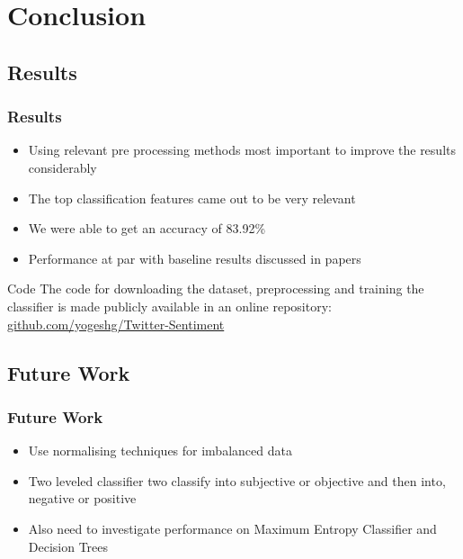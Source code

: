\documentclass{beamer}
\begin{document}
\section{Conclusion}
\subsection{Results}

\begin{frame}
\frametitle{Results}
\begin{itemize}
\item Using relevant pre processing methods most important to improve the results considerably
\item The top classification features came out to be very relevant
\item We were able to get an accuracy of 83.92\%
\item Performance at par with baseline results discussed in papers
\end{itemize}

\begin{block}{Code}
The code for downloading the dataset, preprocessing and training the classifier
is made publicly available in an online repository:\\
\href{https://github.com/yogeshg/Twitter-Sentiment}
{ github.com/yogeshg/Twitter-Sentiment}
\end{block}

\end{frame}
\subsection{Future Work}

\begin{frame}
\frametitle{Future Work}
\begin{itemize}
\item Use normalising techniques for imbalanced data
\item Two leveled classifier two classify into
		subjective or objective and then into, negative or positive
\item Also need to investigate performance on Maximum Entropy Classifier and Decision Trees
\end{itemize}
\end{frame}
\end{document}
